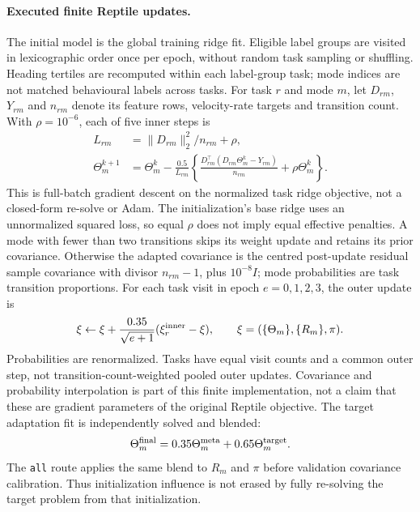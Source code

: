 \documentclass[11pt]{article}
\begin{document}
\paragraph{Executed finite Reptile updates.}
The initial model is the global training ridge fit. Eligible label groups are
visited in lexicographic order once per epoch, without random task sampling
or shuffling. Heading tertiles are recomputed within each label-group task;
mode indices are not matched behavioural labels across tasks. For task
\(r\) and mode \(m\), let \(D_{rm}\), \(Y_{rm}\) and \(n_{rm}\) denote
its feature rows, velocity-rate targets and transition count. With
\(\rho=10^{-6}\), each of five inner steps is
\begin{equation}
 \begin{aligned}
 L_{rm}&=\|D_{rm}\|_2^2/n_{rm}+\rho,\\
 \Theta_m^{k+1}&=\Theta_m^k-\frac{0.5}{L_{rm}}
 \left\{\frac{D_{rm}^{\top}(D_{rm}\Theta_m^k-Y_{rm})}{n_{rm}}
                 +\rho\Theta_m^k\right\}.
 \end{aligned}
 \label{eq:meta-inner}
\end{equation}
This is full-batch gradient descent on the normalized task ridge objective,
not a closed-form re-solve or Adam. The initialization's base ridge uses
an unnormalized squared loss, so equal \(\rho\) does not imply equal
effective penalties. A mode with fewer than two transitions skips its
weight update and retains its prior covariance. Otherwise the adapted
covariance is the centred post-update residual sample covariance with divisor
\(n_{rm}-1\), plus \(10^{-8}I\); mode probabilities are task transition proportions.
For each task visit in epoch \(e=0,1,2,3\), the outer update is
\begin{equation}
 \xi\leftarrow\xi+\frac{0.35}{\sqrt{e+1}}(\xi_r^{\rm inner}-\xi),
 \qquad \xi=(\{\Theta_m\},\{R_m\},\pi).
 \label{eq:meta-outer}
\end{equation}
Probabilities are renormalized. Tasks have equal visit counts and a common
outer step, not transition-count-weighted pooled outer updates. Covariance
and probability interpolation is part of this finite implementation, not
a claim that these are gradient parameters of the original Reptile objective.
The target adaptation fit is independently solved and blended:
\begin{equation}
 \Theta_m^{\rm final}=0.35\Theta_m^{\rm meta}
                         +0.65\Theta_m^{\rm target}.
 \label{eq:target-blend}
\end{equation}
The \texttt{all} route applies the same blend to \(R_m\) and \(\pi\)
before validation covariance calibration. Thus initialization influence is
not erased by fully re-solving the target problem from that initialization.
\end{document}
